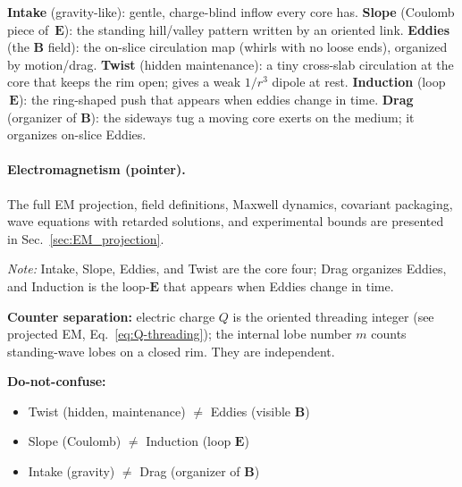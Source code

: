 \begin{tcolorbox}[title=Terminology spine (plain language)]
\textbf{Intake} (gravity-like): gentle, charge-blind inflow every core has.
\textbf{Slope} (Coulomb piece of $\,\mathbf E$): the standing hill/valley pattern written by an oriented link.
\textbf{Eddies} (the $\mathbf B$ field): the on-slice circulation map (whirls with no loose ends), organized by motion/drag.
\textbf{Twist} (hidden maintenance): a tiny cross-slab circulation at the core that keeps the rim open; gives a weak $1/r^3$ dipole at rest.
\textbf{Induction} (loop $\,\mathbf E$): the ring-shaped push that appears when eddies change in time.
\textbf{Drag} (organizer of $\mathbf B$): the sideways tug a moving core exerts on the medium; it organizes on-slice Eddies.
\end{tcolorbox}

\paragraph{Electromagnetism (pointer).}
The full EM projection, field definitions, Maxwell dynamics, covariant packaging, wave equations with retarded solutions, and experimental bounds are presented in Sec.~\ref{sec:EM_projection}.

\emph{Note:} Intake, Slope, Eddies, and Twist are the core four; Drag organizes Eddies, and Induction is the loop-$\mathbf E$ that appears when Eddies change in time.

\begin{tcolorbox}[title=Two independent counters (topology vs. texture),colback=gray!5,colframe=gray!35!black,arc=1mm,boxrule=0.3pt,left=1mm,right=1mm,top=0.5mm,bottom=0.5mm]
\textbf{Counter separation:} electric charge $Q$ is the oriented threading integer (see projected EM, Eq.~\eqref{eq:Q-threading}); the internal lobe number $m$ counts standing-wave lobes on a closed rim. They are independent.
\end{tcolorbox}

\begin{tcolorbox}[colback=gray!5,colframe=gray!35!black,arc=1mm,boxrule=0.3pt,left=1mm,right=1mm,top=0.5mm,bottom=0.5mm]
\textbf{Do-not-confuse:}
\begin{itemize}
  \item Twist (hidden, maintenance) $\neq$ Eddies (visible $\mathbf B$)
  \item Slope (Coulomb) $\neq$ Induction (loop $\mathbf E$)
  \item Intake (gravity) $\neq$ Drag (organizer of $\mathbf B$)
\end{itemize}
\end{tcolorbox}

